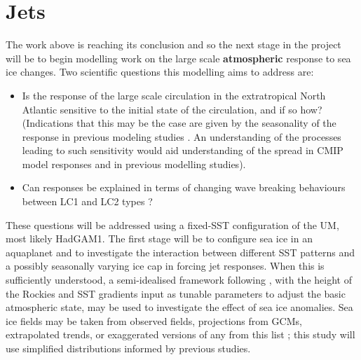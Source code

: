 \documentclass [11pt,a4paper,twosided] {report}
\begin{document}
\section*{Jets}
The work above is reaching its conclusion and so the next stage in the project will be to begin modelling work on the large scale {\bf atmospheric} response to sea ice changes. Two scientific questions this modelling aims to address are:
\begin{itemize}
\item Is the response of the large scale circulation in the extratropical North Atlantic sensitive to the initial state of the circulation, and if so how? (Indications that this may be the case are given by the seasonality of the response in previous modeling studies \citep{SeierstadBader09}. An understanding of the processes leading to such sensitivity would aid understanding of the spread in CMIP model responses and in previous modelling studies). 
\item Can responses be explained in terms of changing wave breaking behaviours between LC1 and LC2 types \citep{THM93}?
\end{itemize}
These questions will be addressed using a fixed-SST configuration of the UM, most likely HadGAM1. The first stage will be to configure sea ice in an aquaplanet and to investigate the interaction between different SST patterns and a possibly seasonally varying ice cap in forcing jet responses. When this is sufficiently understood, a semi-idealised framework following \citet{Brayshaw_tracks1}, with the height of the Rockies and SST gradients input as tunable parameters to adjust the basic atmospheric state, may be used to investigate the effect of sea ice anomalies. Sea ice fields may be taken from observed fields, projections from GCMs, extrapolated trends, or exaggerated versions of any from this list \citep{Deser:part1, Deser:part2, SeierstadBader09}; this study will use simplified distributions informed by previous studies. \\
\end{document}
